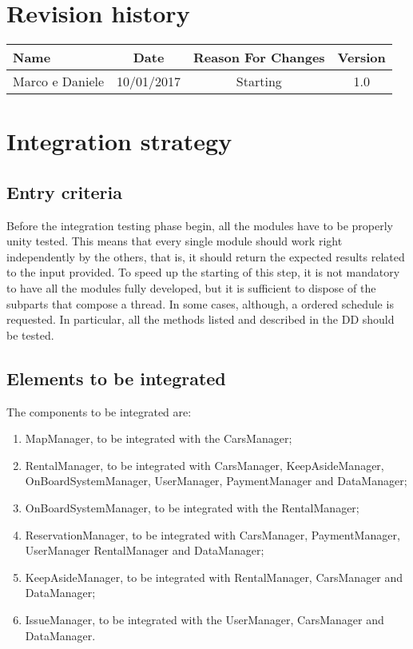 \documentclass{scrreprt}
\begin{document}
\chapter*{Revision history}
\begin{center}
    \begin{tabular}{lccc}
        \toprule
	   \textbf{ Name }& \textbf{ Date  }& \textbf{ Reason For Changes }& \textbf{ Version}\\
        \midrule
	     Marco e Daniele & 10/01/2017 & Starting & 1.0\\
	\bottomrule
    \end{tabular}
\end{center}

\chapter{Integration strategy}

\section{Entry criteria}
Before the integration testing phase begin, all the modules have to be properly unity tested. This means that every single module should work right independently by the others, that is, it should return the expected results related to the input provided.
To speed up the starting of this step, it is not mandatory to have all the modules fully developed, but it is sufficient to dispose of the subparts that compose a thread. In some cases, although, a ordered schedule is requested.
In particular, all the methods listed and described in the DD should be tested.

\section{Elements to be integrated}
The components to be integrated are:

\begin{enumerate}
\item MapManager, to be integrated with the CarsManager;
\item RentalManager, to be integrated with CarsManager, KeepAsideManager, OnBoardSystemManager, UserManager, PaymentManager and DataManager;
\item OnBoardSystemManager, to be integrated with the RentalManager;
\item ReservationManager, to be integrated with CarsManager, PaymentManager, UserManager RentalManager and DataManager;
\item KeepAsideManager, to be integrated with RentalManager, CarsManager and DataManager;
\item IssueManager, to be integrated with the UserManager, CarsManager and DataManager.

\end{enumerate}
\end{document}
